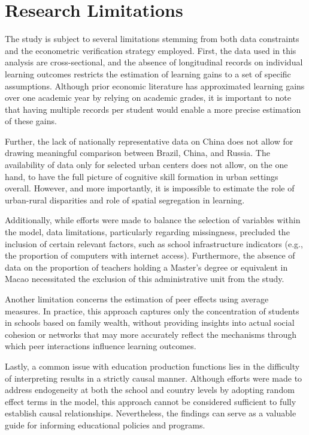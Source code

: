 \documentclass[
]{article}
\begin{document}
\section{Research Limitations}\label{research-limitations}

The study is subject to several limitations stemming from both data
constraints and the econometric verification strategy employed. First,
the data used in this analysis are cross-sectional, and the absence of
longitudinal records on individual learning outcomes restricts the
estimation of learning gains to a set of specific assumptions. Although
prior economic literature has approximated learning gains over one
academic year by relying on academic grades, it is important to note
that having multiple records per student would enable a more precise
estimation of these gains.

Further, the lack of nationally representative data on China does not
allow for drawing meaningful comparison between Brazil, China, and
Russia. The availability of data only for selected urban centers does
not allow, on the one hand, to have the full picture of cognitive skill
formation in urban settings overall. However, and more importantly, it
is impossible to estimate the role of urban-rural disparities and role
of spatial segregation in learning.

Additionally, while efforts were made to balance the selection of
variables within the model, data limitations, particularly regarding
missingness, precluded the inclusion of certain relevant factors, such
as school infrastructure indicators (e.g., the proportion of computers
with internet access). Furthermore, the absence of data on the
proportion of teachers holding a Master's degree or equivalent in Macao
necessitated the exclusion of this administrative unit from the study.

Another limitation concerns the estimation of peer effects using average
measures. In practice, this approach captures only the concentration of
students in schools based on family wealth, without providing insights
into actual social cohesion or networks that may more accurately reflect
the mechanisms through which peer interactions influence learning
outcomes.

Lastly, a common issue with education production functions lies in the
difficulty of interpreting results in a strictly causal manner. Although
efforts were made to address endogeneity at both the school and country
levels by adopting random effect terms in the model, this approach
cannot be considered sufficient to fully establish causal relationships.
Nevertheless, the findings can serve as a valuable guide for informing
educational policies and programs.
\end{document}
